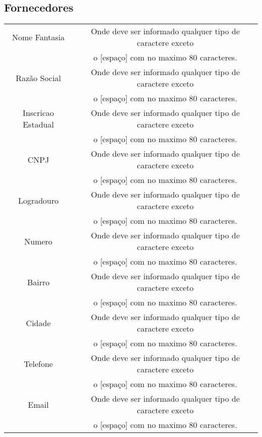 \documentclass[titlepage]{article}
\begin{document}
				\subsection{Fornecedores}
				\begin{table}[h]%
					\begin{tabular}{|c|c|}
					\hline
					Nome Fantasia  & Onde deve ser informado qualquer tipo de caractere exceto \\& o [espaço] com no maximo 80 caracteres.\\
					\hline
					Razão Social  & Onde deve ser informado qualquer tipo de caractere exceto \\& o [espaço] com no maximo 80 caracteres.\\
					\hline
					Inscricao Estadual  & Onde deve ser informado qualquer tipo de caractere exceto \\& o [espaço] com no maximo 80 caracteres.\\
					\hline
					CNPJ & Onde deve ser informado qualquer tipo de caractere exceto \\& o [espaço] com no maximo 80 caracteres.\\
					\hline
					Logradouro & Onde deve ser informado qualquer tipo de caractere exceto \\& o [espaço] com no maximo 80 caracteres.\\
					\hline					
					Numero & Onde deve ser informado qualquer tipo de caractere exceto \\& o [espaço] com no maximo 80 caracteres.\\
					\hline					
					Bairro & Onde deve ser informado qualquer tipo de caractere exceto \\& o [espaço] com no maximo 80 caracteres.\\
					\hline
					Cidade & Onde deve ser informado qualquer tipo de caractere exceto \\& o [espaço] com no maximo 80 caracteres.\\
					\hline
					Telefone & Onde deve ser informado qualquer tipo de caractere exceto \\& o [espaço] com no maximo 80 caracteres.\\
					\hline
					Email & Onde deve ser informado qualquer tipo de caractere exceto \\& o [espaço] com no maximo 80 caracteres.\\
					\hline
					\end{tabular}
				\end{table}
\end{document}
